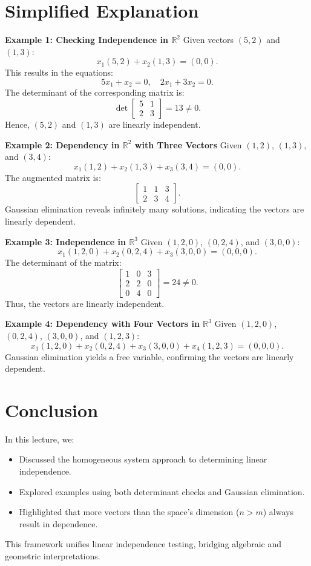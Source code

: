 \documentclass{article}
\begin{document}
\section*{Simplified Explanation}

\textbf{Example 1: Checking Independence in $\mathbb{R}^2$}
Given vectors $(5, 2)$ and $(1, 3)$:
\[
  x_1(5, 2) + x_2(1, 3) = (0, 0).
\]
This results in the equations:
\[
  5x_1 + x_2 = 0, \quad 2x_1 + 3x_2 = 0.
\]
The determinant of the corresponding matrix is:
\[
  \det
  \begin{bmatrix}
    5 & 1 \\
    2 & 3
  \end{bmatrix} = 13 \neq 0.
\]
Hence, $(5, 2)$ and $(1, 3)$ are linearly independent.

\textbf{Example 2: Dependency in $\mathbb{R}^2$ with Three Vectors}
Given $(1, 2)$, $(1, 3)$, and $(3, 4)$:
\[
  x_1(1, 2) + x_2(1, 3) + x_3(3, 4) = (0, 0).
\]
The augmented matrix is:
\[
  \begin{bmatrix}
    1 & 1 & 3 \\
    2 & 3 & 4
  \end{bmatrix}.
\]
Gaussian elimination reveals infinitely many solutions, indicating the vectors are linearly dependent.

\textbf{Example 3: Independence in $\mathbb{R}^3$}
Given $(1, 2, 0)$, $(0, 2, 4)$, and $(3, 0, 0)$:
\[
  x_1(1, 2, 0) + x_2(0, 2, 4) + x_3(3, 0, 0) = (0, 0, 0).
\]
The determinant of the matrix:
\[
  \begin{bmatrix}
    1 & 0 & 3 \\
    2 & 2 & 0 \\
    0 & 4 & 0
  \end{bmatrix} = 24 \neq 0.
\]
Thus, the vectors are linearly independent.

\textbf{Example 4: Dependency with Four Vectors in $\mathbb{R}^3$}
Given $(1, 2, 0)$, $(0, 2, 4)$, $(3, 0, 0)$, and $(1, 2, 3)$:
\[
  x_1(1, 2, 0) + x_2(0, 2, 4) + x_3(3, 0, 0) + x_4(1, 2, 3) = (0, 0, 0).
\]
Gaussian elimination yields a free variable, confirming the vectors are linearly dependent.

\section*{Conclusion}

In this lecture, we:
\begin{itemize}
  \item Discussed the homogeneous system approach to determining linear independence.
  \item Explored examples using both determinant checks and Gaussian elimination.
  \item Highlighted that more vectors than the space's dimension ($n > m$) always result in dependence.
\end{itemize}

This framework unifies linear independence testing, bridging algebraic and geometric interpretations.
\end{document}
